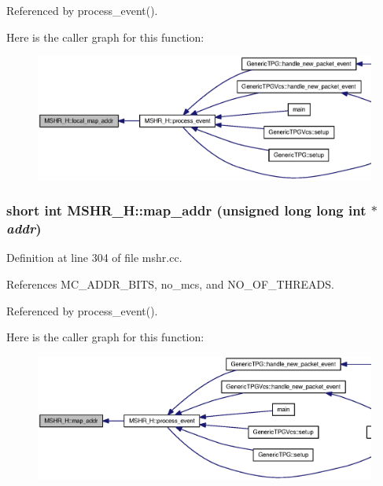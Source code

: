 Referenced by process\_\-event().

Here is the caller graph for this function:\nopagebreak
\begin{figure}[H]
\begin{center}
\leavevmode
\includegraphics[width=387pt]{classMSHR__H_31a63345b220f9e3eaefc9b4eb012f6b_icgraph}
\end{center}
\end{figure}
\subsubsection[{map\_\-addr}]{\setlength{\rightskip}{0pt plus 5cm}short int MSHR\_\-H::map\_\-addr (unsigned long long int $\ast$ {\em addr})}\label{classMSHR__H_aeb79565c3b2b9058ae8e270f739ae6d}




Definition at line 304 of file mshr.cc.

References MC\_\-ADDR\_\-BITS, no\_\-mcs, and NO\_\-OF\_\-THREADS.

Referenced by process\_\-event().

Here is the caller graph for this function:\nopagebreak
\begin{figure}[H]
\begin{center}
\leavevmode
\includegraphics[width=374pt]{classMSHR__H_aeb79565c3b2b9058ae8e270f739ae6d_icgraph}
\end{center}
\end{figure}
